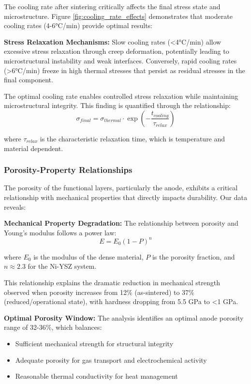 \documentclass[conference]{IEEEtran}
\begin{document}
The cooling rate after sintering critically affects the final stress state and microstructure. Figure \ref{fig:cooling_rate_effects} demonstrates that moderate cooling rates (4-6°C/min) provide optimal results:

\textbf{Stress Relaxation Mechanisms:}
Slow cooling rates (<4°C/min) allow excessive stress relaxation through creep deformation, potentially leading to microstructural instability and weak interfaces. Conversely, rapid cooling rates (>6°C/min) freeze in high thermal stresses that persist as residual stresses in the final component.

The optimal cooling rate enables controlled stress relaxation while maintaining microstructural integrity. This finding is quantified through the relationship:
\begin{equation}
\sigma_{final} = \sigma_{thermal} \cdot \exp\left(-\frac{t_{cooling}}{\tau_{relax}}\right)
\end{equation}

where $\tau_{relax}$ is the characteristic relaxation time, which is temperature and material dependent.

\subsubsection{Porosity-Property Relationships}

The porosity of the functional layers, particularly the anode, exhibits a critical relationship with mechanical properties that directly impacts durability. Our data reveals:

\textbf{Mechanical Property Degradation:}
The relationship between porosity and Young's modulus follows a power law:
\begin{equation}
E = E_0(1-P)^n
\end{equation}

where $E_0$ is the modulus of the dense material, $P$ is the porosity fraction, and $n ≈ 2.3$ for the Ni-YSZ system.

This relationship explains the dramatic reduction in mechanical strength observed when porosity increases from 12\% (as-sintered) to 37\% (reduced/operational state), with hardness dropping from 5.5 GPa to <1 GPa.

\textbf{Optimal Porosity Window:}
The analysis identifies an optimal anode porosity range of 32-36\%, which balances:
\begin{itemize}
\item Sufficient mechanical strength for structural integrity
\item Adequate porosity for gas transport and electrochemical activity
\item Reasonable thermal conductivity for heat management
\end{itemize}
\end{document}
